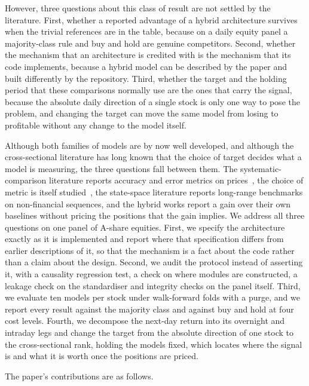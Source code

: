 \documentclass[pdflatex,sn-mathphys-ay]{sn-jnl}
\theoremstyle{thmstyleone}%
\theoremstyle{thmstyletwo}%
\theoremstyle{thmstyletwo}%
\begin{document}
However, three questions about this class of result are not settled by the literature. First, whether
a reported advantage of a hybrid architecture survives when the trivial references are in the table,
because on a daily equity panel a majority-class rule and buy and hold are genuine competitors.
Second, whether the mechanism that an architecture is credited with is the mechanism that its code
implements, because a hybrid model can be described by the paper and built differently by the
repository. Third, whether the target and the holding period that these comparisons normally use are
the ones that carry the signal, because the absolute daily direction of a single stock is only one way
to pose the problem, and changing the target can move the same model from losing to profitable
without any change to the model itself.

Although both families of models are by now well developed, and although the cross-sectional
literature has long known that the choice of target decides what a model is measuring, the three
questions fall between them. The systematic-comparison literature reports accuracy and error metrics
on prices~\citep{hu2025fintsb,MAEandR2,RMSE}, the choice of metric is itself
studied~\citep{f1-score,recall}, the state-space literature reports long-range benchmarks on
non-financial sequences, and the hybrid works report a gain over their own baselines without pricing
the positions that the gain implies. We address all three questions on one panel of A-share equities.
First, we specify the architecture exactly as it is implemented and report where that specification
differs from earlier descriptions of it, so that the mechanism is a fact about the code rather than a
claim about the design. Second, we audit the protocol instead of asserting it, with a causality
regression test, a check on where modules are constructed, a leakage check on the standardiser and
integrity checks on the panel itself. Third, we evaluate ten models per stock under walk-forward
folds with a purge, and we report every result against the majority class and against buy and hold at
four cost levels. Fourth, we decompose the next-day return into its overnight and intraday legs and
change the target from the absolute direction of one stock to the cross-sectional rank, holding the
models fixed, which locates where the signal is and what it is worth once the positions are priced.

The paper's contributions are as follows.
\end{document}
